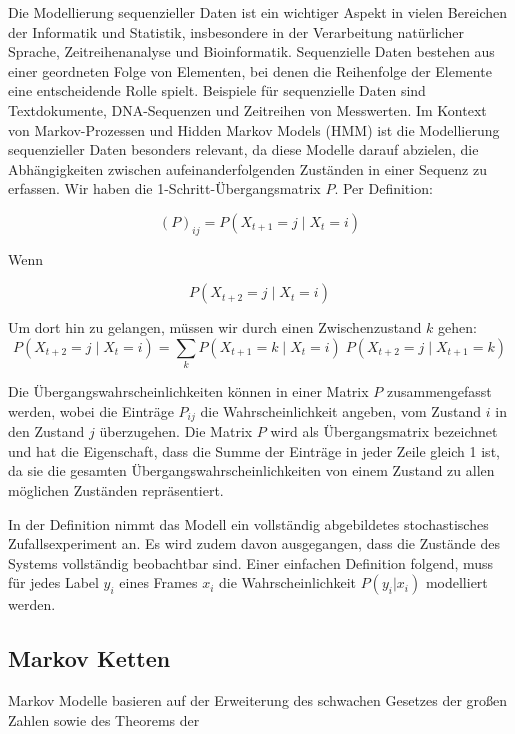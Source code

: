 Die Modellierung sequenzieller Daten ist ein wichtiger Aspekt in vielen Bereichen der Informatik und Statistik, insbesondere in der Verarbeitung natürlicher Sprache, Zeitreihenanalyse und Bioinformatik. Sequenzielle Daten bestehen aus einer geordneten Folge von Elementen, bei denen die Reihenfolge der Elemente eine entscheidende Rolle spielt. Beispiele für sequenzielle Daten sind Textdokumente, DNA-Sequenzen und Zeitreihen von Messwerten.
\newline
Im Kontext von Markov-Prozessen und Hidden Markov Models (HMM) ist die Modellierung sequenzieller Daten besonders relevant, da diese Modelle darauf abzielen, die Abhängigkeiten zwischen aufeinanderfolgenden Zuständen in einer Sequenz zu erfassen.
\newline
Wir haben die 1-Schritt-Übergangsmatrix $P$.
Per Definition:

$$
(P)_{ij} = P(X_{t+1} = j \mid X_t = i)
$$

Wenn 

$$
P(X_{t+2} = j \mid X_t = i)
$$

Um dort hin zu gelangen, müssen wir durch einen Zwischenzustand $k$ gehen:
$$
P(X_{t+2} = j \mid X_t = i) = \sum_k P(X_{t+1} = k \mid X_t = i)\; P(X_{t+2} = j \mid X_{t+1} = k)
$$

\newline
Die Übergangswahrscheinlichkeiten können in einer Matrix $P$ zusammengefasst werden,
wobei die Einträge $P_{ij}$ die Wahrscheinlichkeit angeben, vom Zustand $i$ in den Zustand $j$ überzugehen.
Die Matrix $P$ wird als Übergangsmatrix bezeichnet und hat die Eigenschaft, dass die Summe der Einträge in jeder Zeile gleich 1 ist, da sie die gesamten Übergangswahrscheinlichkeiten von einem Zustand zu allen möglichen Zuständen repräsentiert.
\newline


In der Definition nimmt das Modell ein vollständig abgebildetes stochastisches Zufallsexperiment an.
Es wird zudem davon ausgegangen, dass die Zustände des Systems vollständig beobachtbar sind.
Einer einfachen Definition folgend, muss für jedes Label $y_i$ eines Frames $x_i$ die Wahrscheinlichkeit $P(y_i|x_i)$ modelliert werden.

\subsection{Markov Ketten}

Markov Modelle basieren auf der Erweiterung des schwachen Gesetzes der großen Zahlen sowie des Theorems der 

